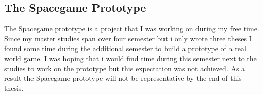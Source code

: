 \subsection{The Spacegame Prototype}

The Spacegame prototype is a project that I was working on during my free
time. Since my master studies span over four semester but i only wrote three
theses I found some time during the additional semester to build a prototype
of a real world game. I was hoping that i would find time during this semester
next to the studies to work on the prototype but this expectation was not
achieved. As a result the Spacegame prototype will not be representative by the
end of this thesis.

